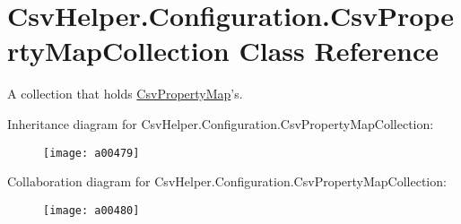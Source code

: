 \hypertarget{a00065}{\section{Csv\-Helper.\-Configuration.\-Csv\-Property\-Map\-Collection Class Reference}
\label{a00065}
}


A collection that holds \hyperlink{a00064}{Csv\-Property\-Map}'s.  




Inheritance diagram for Csv\-Helper.\-Configuration.\-Csv\-Property\-Map\-Collection\-:
\nopagebreak
\begin{figure}[H]
\begin{center}
\leavevmode
\texttt{[image: a00479]}
\end{center}
\end{figure}


Collaboration diagram for Csv\-Helper.\-Configuration.\-Csv\-Property\-Map\-Collection\-:
\nopagebreak
\begin{figure}[H]
\begin{center}
\leavevmode
\texttt{[image: a00480]}
\end{center}
\end{figure}
